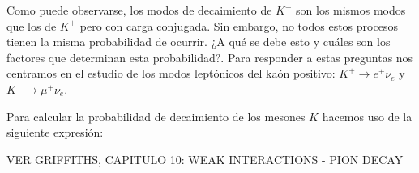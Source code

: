 Como puede observarse, los modos de decaimiento de $K^{-}$ son los mismos modos que los de $K^{+}$ pero con carga conjugada. Sin embargo, no todos estos procesos tienen la misma probabilidad de ocurrir. ¿A qué se debe esto y cuáles son los factores que determinan esta probabilidad?. Para responder a estas preguntas nos centramos en el estudio de los modos leptónicos del kaón positivo: $K^{+} \rightarrow e^{+}\nu_{e}$ y $K^{+} \rightarrow \mu^{+}\nu_{e}$.

Para calcular la probabilidad de decaimiento de los mesones $K$ hacemos uso de la siguiente expresión:

VER GRIFFITHS, CAPITULO 10: WEAK INTERACTIONS - PION DECAY